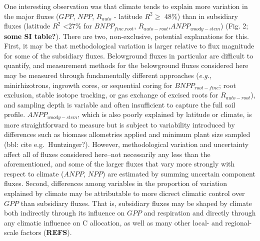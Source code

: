 \documentclass[]{article}
\begin{document}
One interesting observation was that climate tends to explain more
variation in the major fluxes (\(GPP\), \(NPP\), \(R_{auto}\) - latitude
\(R^2\ge\) 48\%) than in subsidiary fluxes (latitude \(R^2\)
\textless{}27\% for \(BNPP_{fine.root}\),
\(R_{auto-root}\),\(ANPP_{woody-stem}\)) (Fig. 2; \textbf{some SI
table?}). There are two, non-exclusive, potential explanations for this.
First, it may be that methodological variation is larger relative to
flux magnitude for some of the subsidiary fluxes. Belowground fluxes in
particular are difficult to quantify, and measurement methods for the
belowground fluxes considered here may be measured through fundamentally
different approaches (\emph{e.g.}, minirhizotrons, ingrowth cores, or
sequential coring for \(BNPP_{root-fine}\); root exclusion, stable
isotope tracking, or gas exchange of excised roots for
\(R_{auto-root}\)), and sampling depth is variable and often
insufficient to capture the full soil profile. \(ANPP_{woody-stem}\),
which is also poorly explained by latitude or climate, is more
straightforward to measure but is subject to variability introduced by
differences such as biomass allometries applied and minimum plant size
sampled (bbl: cite e.g.~Huntzinger?). However, methodological variation
and uncertainty affect all of fluxes considered here--not necessarily
any less than the aforementioned, and some of the larger fluxes that
vary more strongly with respect to climate (\(ANPP\), \(NPP\)) are
estimated by summing uncertain component fluxes. Second, differences
among variables in the proportion of variation explained by climate may
be attributable to more dicrect climatic control over \(GPP\) than
subsidiary fluxes. That is, subsidiary fluxes may be shaped by climate
both indirectly through its influence on \(GPP\) and respiration and
directly through any climatic influence on C allocation, as well as many
other local- and regional-scale factors (\textbf{REFS}).
\end{document}
